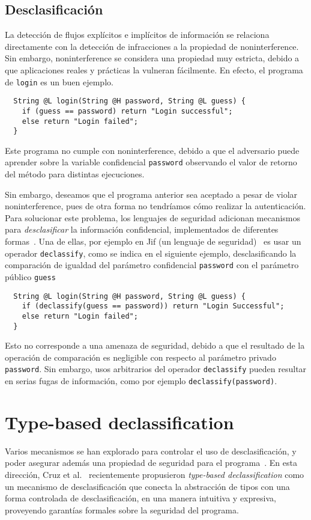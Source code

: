 \subsection{Desclasificación}
La detección de flujos explícitos e implícitos de información se relaciona directamente con la detección de infracciones a la propiedad de noninterference. Sin embargo, noninterference se considera una propiedad muy estricta, debido a que aplicaciones reales y prácticas la vulneran fácilmente. En efecto, el programa de \texttt{login} es un buen ejemplo.

\begin{lstlisting}
  String @L login(String @H password, String @L guess) {
    if (guess == password) return "Login successful";
    else return "Login failed";
  }
\end{lstlisting}

Este programa no cumple con noninterference, debido a que el adversario puede aprender sobre la variable confidencial \texttt{password} observando el valor de retorno del método para distintas ejecuciones.

Sin embargo, deseamos que el programa anterior sea aceptado a pesar de violar noninterference, pues de otra forma no tendríamos cómo realizar la autenticación. Para solucionar este problema, los lenguajes de seguridad adicionan mecanismos para \textit{desclasificar} la información confidencial, implementados de diferentes formas~\cite{sabelfeldSands:JCS09}. Una de ellas, por ejemplo en Jif (un lenguaje de seguridad)~\cite{jif} es usar un operador \texttt{declassify}, como se indica en el siguiente ejemplo, desclasificando la comparación de igualdad del parámetro confidencial \texttt{password} con el parámetro público \texttt{guess}

\begin{lstlisting}
  String @L login(String @H password, String @L guess) {
    if (declassify(guess == password)) return "Login Successful";
    else return "Login failed";
  }
\end{lstlisting}

Esto no corresponde a una amenaza de seguridad, debido a que el resultado de la operación de comparación es negligible con respecto al parámetro privado \texttt{password}. Sin embargo, usos arbitrarios del operador \texttt{declassify} pueden resultar en serias fugas de información, como por ejemplo \texttt{declassify(password)}.
\section{Type-based declassification}
Varios mecanismos se han explorado para controlar el uso de desclasificación, y poder asegurar además una propiedad de seguridad para el programa~\cite{sabelfeldSands:JCS09}. En esta dirección, Cruz et al.~\cite{cruzAl:ecoop2017} recientemente propusieron \textit{type-based declassification} como un mecanismo de desclasificación que conecta la abstracción de tipos con una forma controlada de desclasificación, en una manera intuitiva y expresiva, proveyendo garantías formales sobre la seguridad del programa.

